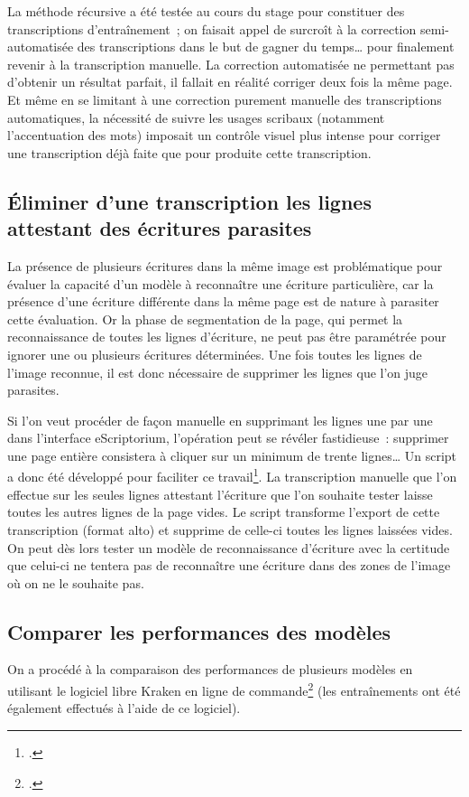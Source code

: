 \documentclass[a4paper,12pt,twoside]{book}
\begin{document}
				La méthode récursive a été testée au cours du stage pour constituer des transcriptions d'entraînement~; on faisait appel de surcroît à la correction semi-automatisée des transcriptions dans le but de gagner du temps… pour finalement revenir à la transcription manuelle. La correction automatisée ne permettant pas d'obtenir un résultat parfait, il fallait en réalité corriger deux fois la même page. Et même en se limitant à une correction purement manuelle des transcriptions automatiques, la nécessité de suivre les usages scribaux (notamment l'accentuation des mots) imposait un contrôle visuel plus intense pour corriger une transcription déjà faite que pour produite cette transcription.
			
			\subsection{Éliminer d'une transcription les lignes attestant des écritures parasites}
				La présence de plusieurs écritures dans la même image est problématique pour évaluer la capacité d'un modèle à reconnaître une écriture particulière, car la présence d'une écriture différente dans la même page est de nature à parasiter cette évaluation. Or la phase de \gls{segmentation} de la page, qui permet la reconnaissance de toutes les lignes d'écriture, ne peut pas être paramétrée pour ignorer une ou plusieurs écritures déterminées. Une fois toutes les lignes de l'image reconnue, il est donc nécessaire de supprimer les lignes que l'on juge parasites.
				
				Si l'on veut procéder de façon manuelle en supprimant les lignes une par une dans l'interface eScriptorium, l'opération peut se révéler fastidieuse~: supprimer une page entière consistera à cliquer sur un minimum de trente lignes… Un script a donc été développé pour faciliter ce travail\footcite{biaySupprLignesVidesPy2022}. La transcription manuelle que l'on effectue sur les seules lignes attestant l'écriture que l'on souhaite tester laisse toutes les autres lignes de la page vides. Le script transforme l'export de cette transcription (format \gls{alto}) et supprime de celle-ci toutes les lignes laissées vides. On peut dès lors tester un modèle de reconnaissance d'écriture avec la certitude que celui-ci ne tentera pas de reconnaître une écriture dans des zones de l'image où on ne le souhaite pas.
				
			\subsection{Comparer les performances des modèles}
				On a procédé à la comparaison des performances de plusieurs modèles en utilisant le logiciel libre Kraken en ligne de commande\footcite{KrakenDocumentation} (les entraînements ont été également effectués à l'aide de ce logiciel).
				
\end{document}
